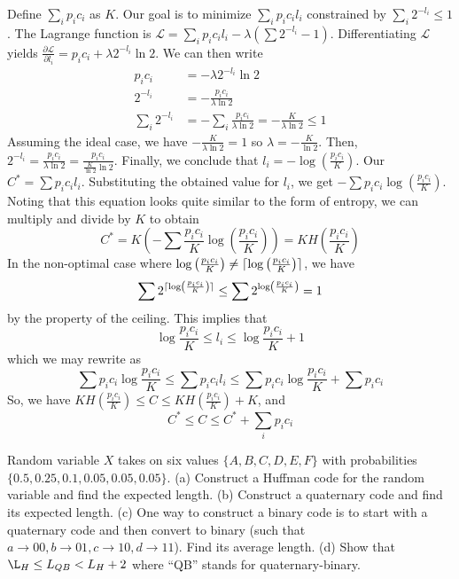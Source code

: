 \documentclass[11pt]{article}
\DeclarePairedDelimiter{\ceil}{\lceil}{\rceil}
\theoremstyle{definition}
\begin{document}
\noindent Define $\sum_i p_i c_i$ as $K$. Our goal is to minimize $\sum_i p_i c_i l_i$ constrained by $\sum_i 2^{-l_i} \leq 1$. The Lagrange function is $\mathcal{L} = \sum_i p_i c_i l_i - \lambda(\sum 2^{-l_i} - 1)$. Differentiating $\mathcal{L}$ yields $\frac{\partial \mathcal{L}}{\partial l_i} = p_i c_i + \lambda 2^{-l_i} \ln 2$. We can then write 
\begin{align*}
p_ic_i &= -\lambda 2^{-l_i} \ln 2 \\
2^{-l_i} &= -\frac{p_i c_i}{\lambda \ln 2} \\
\sum_i 2^{-l_i} &= -\sum_i \frac{p_i c_i}{\lambda \ln 2} = -\frac{K}{\lambda \ln 2} \leq 1
\end{align*} 
Assuming the ideal case, we have $-\frac{K}{\lambda \ln 2} = 1$ so $\lambda = -\frac{K}{\ln 2}$. Then, $2^{-l_i} = \frac{p_i c_i}{\lambda \ln 2} = \frac{p_i c_i}{\frac{K}{\ln 2} \ln 2}$. Finally, we conclude that $l_i = -\log \left( \frac{p_ic_i}{K} \right)$. Our $C^* = \sum p_i c_i l_i$. Substituting the obtained value for $l_i$, we get $-\sum p_i c_i \log \left( \frac{p_i c_i}{K} \right)$. Noting that this equation looks quite similar to the form of entropy, we can multiply and divide by $K$ to obtain $$C^* = K \left( -\sum \frac{p_i c_i}{K} \log \left( \frac{p_i c_i}{K} \right) \right) = K H\left(\frac{p_i c_i}{K} \right)$$In the non-optimal case where $\log \left( \frac{p_i c_i}{K} \right) \neq \ceil{\log \left( \frac{p_i c_i}{K} \right)}$, we have $$\sum 2^{\ceil{\log \left( \frac{p_i c_i}{K} \right)}} \leq \sum 2^{\log \left( \frac{p_i c_i}{K} \right)} = 1$$by the property of the ceiling. This implies that $$\log \frac{p_i c_i}{K} \leq l_i \leq \log \frac{p_i c_i}{K} + 1$$which we may rewrite as $$\sum p_ic_i \log \frac{p_i c_i}{K} \leq \sum p_ic_i l_i \leq \sum p_ic_i \log \frac{p_i c_i}{K} + \sum p_ic_i$$So, we have $KH\left(\frac{p_ic_i}{K} \right) \leq C \leq KH\left(\frac{p_ic_i}{K} \right) + K$, and $$C^* \leq C \leq C^* + \sum_i p_i c_i$$

\example Random variable $X$ takes on six values $\{A, B, C, D, E, F\}$ with probabilities \\$\{0.5, 0.25, 0.1, 0.05, 0.05, 0.05\}$. (a) Construct a Huffman code for the random variable and find the expected length. (b) Construct a quaternary code and find its expected length. (c) One way to construct a binary code is to start with a quaternary code and then convert to binary (such that $a \rightarrow 00, b \rightarrow 01, c \rightarrow 10, d \rightarrow 11$). Find its average length. (d) Show that $\L_H \leq L_{QB} < L_H + 2$ where ``QB'' stands for quaternary-binary. 
\end{document}
